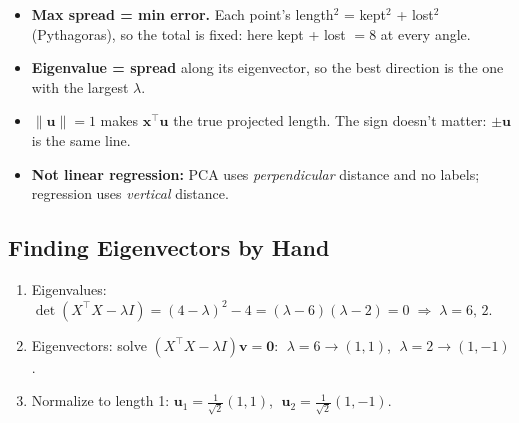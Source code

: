{
\par}

\begin{itemize}
  \item \textbf{Max spread = min error.} Each point's length$^2$ = kept$^2$ + lost$^2$ (Pythagoras), so the total is fixed: here kept + lost $= 8$ at every angle.
  \item \textbf{Eigenvalue = spread} along its eigenvector, so the best direction is the one with the largest $\lambda$.
  \item $\|\mathbf{u}\| = 1$ makes $\mathbf{x}^\top\mathbf{u}$ the true projected length. The sign doesn't matter: $\pm\mathbf{u}$ is the same line.
  \item \textbf{Not linear regression:} PCA uses \emph{perpendicular} distance and no labels; regression uses \emph{vertical} distance.
\end{itemize}

\subsection*{Finding Eigenvectors by Hand}
\begin{enumerate}[leftmargin=1.5em]
  \item Eigenvalues: $\det(X^\top X - \lambda I) = (4-\lambda)^2 - 4 = (\lambda - 6)(\lambda - 2) = 0 \;\Rightarrow\; \lambda = 6,\, 2$.
  \item Eigenvectors: solve $(X^\top X - \lambda I)\mathbf{v} = \mathbf{0}$: $\;\lambda = 6 \to (1,1)$, $\;\lambda = 2 \to (1,-1)$.
  \item Normalize to length 1: $\mathbf{u}_1 = \frac{1}{\sqrt2}(1,1)$, $\;\mathbf{u}_2 = \frac{1}{\sqrt2}(1,-1)$.
\end{enumerate}

